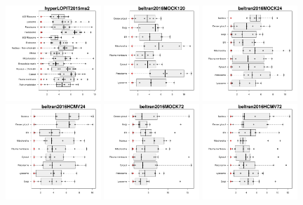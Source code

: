 \documentclass[12pt]{article}\usepackage[]{graphicx}\usepackage[]{color}
\begin{document}
\begin{appendices}
\begin{figure}[htb]
  \includegraphics[width = 0.32\textwidth]{./figure/allqseps-6.pdf}
  \includegraphics[width = 0.32\textwidth]{./figure/allqseps-7.pdf}
  \includegraphics[width = 0.32\textwidth]{./figure/allqseps-8.pdf}
  \includegraphics[width = 0.32\textwidth]{./figure/allqseps-9.pdf}
  \includegraphics[width = 0.32\textwidth]{./figure/allqseps-10.pdf}
  \includegraphics[width = 0.32\textwidth]{./figure/allqseps-11.pdf}

\end{figure}
\end{appendices}
\end{document}
